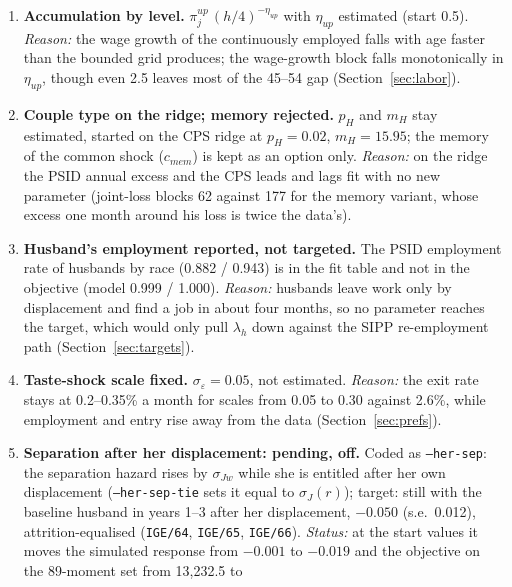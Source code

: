 \documentclass[11pt]{article}
\newcommand{\code}[1]{\texttt{#1}}
\newcommand{\1}{\mathbf{1}}
\begin{document}
\begin{enumerate}[label=\textbf{D\arabic*.}, ref=D\arabic*, leftmargin=*]
  credit-card rate of 1995--2021 (11.4\%) less 3\%; a coded input, not estimated. \emph{Reason:} it lowers the
  objective at every borrowing limit tried and brings the young couples' debt share to the data
  (Section~\ref{sec:gov}); the 45--59 wealth shape stays an open misfit.
  \item \label{od:eta} \textbf{Accumulation by level.} $\pi^{up}_j\,(h/4)^{-\eta_{up}}$ with $\eta_{up}$ estimated
  (start 0.5). \emph{Reason:} the wage growth of the continuously employed falls with age faster than the bounded grid
  produces; the wage-growth block falls monotonically in $\eta_{up}$, though even 2.5 leaves most of the 45--54 gap
  (Section~\ref{sec:labor}).
  \item \label{od:ridge} \textbf{Couple type on the ridge; memory rejected.} $p_H$ and $m_H$ stay estimated, started on
  the CPS ridge at $p_H = 0.02$, $m_H = 15.95$; the memory of the common shock ($c_{mem}$) is kept as an option only.
  \emph{Reason:} on the ridge the PSID annual excess and the CPS leads and lags fit with no new parameter (joint-loss
  blocks 62 against 177 for the memory variant, whose excess one month around his loss is twice the data's).
  \item \label{od:hemp} \textbf{Husband's employment reported, not targeted.} The PSID employment rate of husbands by
  race (0.882 / 0.943) is in the fit table and not in the objective (model 0.999 / 1.000). \emph{Reason:} husbands leave
  work only by displacement and find a job in about four months, so no parameter reaches the target, which would only
  pull $\lambda_h$ down against the SIPP re-employment path (Section~\ref{sec:targets}).
  \item \label{od:sigma} \textbf{Taste-shock scale fixed.} $\sigma_\varepsilon = 0.05$, not estimated. \emph{Reason:}
  the exit rate stays at 0.2--0.35\% a month for scales from 0.05 to 0.30 against 2.6\%, while employment and entry rise
  away from the data (Section~\ref{sec:prefs}).
  \item \label{od:hersep} \textbf{Separation after her displacement: pending, off.} Coded as \code{--her-sep}: the
  separation hazard rises by $\sigma_{Jw}$ while she is entitled after her own displacement (\code{--her-sep-tie} sets
  it equal to $\sigma_J(r)$); target: still with the baseline husband in years 1--3 after her displacement, $-0.050$
  (s.e.\ 0.012), attrition-equalised (\code{IGE/64}, \code{IGE/65}, \code{IGE/66}). \emph{Status:} at the start values
  it moves the simulated response from $-0.001$ to $-0.019$ and the objective on the 89-moment set from 13{,}232.5 to

\end{enumerate}
\end{document}
